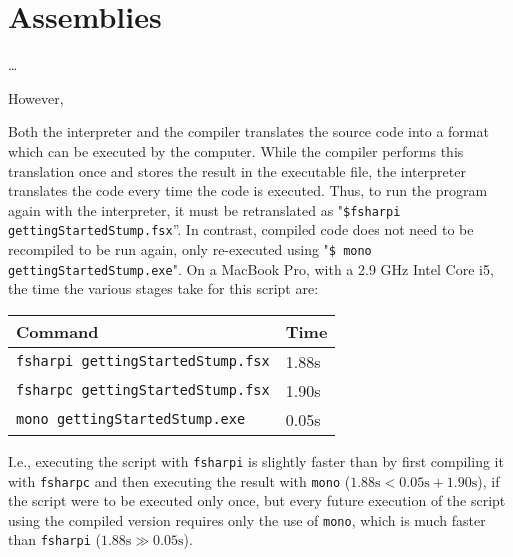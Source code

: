 \documentclass[fsharpNotes.tex]{subfiles}
\begin{document}
\chapter{Assemblies}
\label{chap:assemblies}

\dots

However,  


Both the interpreter and the compiler translates the source code into a format which can be executed by the computer. While the compiler performs this translation once and stores the result in the executable file, the interpreter translates the code every time the code is executed. Thus, to run the program again with the interpreter, it must be retranslated as "\lstinline[language=console]{$fsharpi gettingStartedStump.fsx}''. %
In contrast, compiled code does not need to be recompiled to be run again, only re-executed using "\lstinline[language=console]{$ mono gettingStartedStump.exe}". %
On a MacBook Pro, with a 2.9 GHz Intel Core i5, the time the various stages take for this script are:
\begin{center}
  \begin{tabular}{|l|l|}
    \hline
    \rowcolor{headerRowColor} Command & Time\\
    \hline
    \lstinline[language=console]|fsharpi gettingStartedStump.fsx| & 1.88s\\
    \lstinline[language=console]|fsharpc gettingStartedStump.fsx| & 1.90s\\
    \lstinline[language=console]|mono gettingStartedStump.exe| & 0.05s\\
    \hline
\end{tabular}
\end{center}
I.e., executing the script with \lstinline[language=console]|fsharpi| is slightly faster than by first compiling it with \lstinline[language=console]|fsharpc| and then executing the result with \lstinline[language=console]|mono| ($1.88\text{s} < 0.05\text{s}+1.90\text{s}$), if the script were to be executed only once, but every future execution of the script using the compiled version requires only the use of \lstinline[language=console]|mono|, which is much faster than \lstinline[language=console]|fsharpi| ($1.88\text{s}\gg 0.05\text{s}$).
\end{document}
